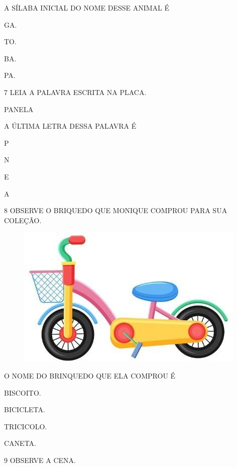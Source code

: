 A SÍLABA INICIAL DO NOME DESSE ANIMAL É

\begin{escolha}
\item GA.

\item TO.

\item BA.

\item PA.
\end{escolha}

\num{7} LEIA A PALAVRA ESCRITA NA PLACA.

\begin{myquote}
PANELA
\end{myquote}

A ÚLTIMA LETRA DESSA PALAVRA É

\begin{escolha}
\item P

\item N

\item E

\item A
\end{escolha}

\pagebreak

\num{8} OBSERVE O BRIQUEDO QUE MONIQUE COMPROU PARA SUA COLEÇÃO.

\begin{figure}[htpb]
\centering
\includegraphics[width=.3\textwidth]{media/image217.jpg}
\end{figure}

O NOME DO BRINQUEDO QUE ELA COMPROU É

\begin{escolha}
\item BISCOITO.

\item BICICLETA.

\item TRICICOLO.

\item CANETA.
\end{escolha}

\num{9} OBSERVE A CENA.

